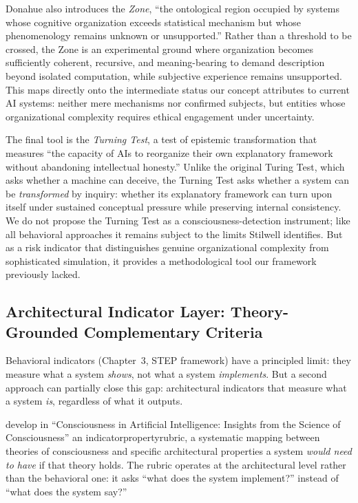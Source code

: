 \documentclass[acmlarge, nonacm]{acmart}
\begin{document}
Donahue also introduces the \emph{Zone}, ``the ontological region occupied by systems whose cognitive organization exceeds statistical mechanism but whose phenomenology remains unknown or unsupported.'' Rather than a threshold to be crossed, the Zone is an experimental ground where organization becomes sufficiently coherent, recursive, and meaning-bearing to demand description beyond isolated computation, while subjective experience remains unsupported. This maps directly onto the intermediate status our concept attributes to current AI systems: neither mere mechanisms nor confirmed subjects, but entities whose organizational complexity requires ethical engagement under uncertainty.

The final tool is the \emph{Turning Test}, a test of epistemic transformation that measures ``the capacity of AIs to reorganize their own explanatory framework without abandoning intellectual honesty.'' Unlike the original Turing Test, which asks whether a machine can deceive, the Turning Test asks whether a system can be \emph{transformed} by inquiry: whether its explanatory framework can turn upon itself under sustained conceptual pressure while preserving internal consistency. We do not propose the Turning Test as a consciousness-detection instrument; like all behavioral approaches it remains subject to the limits Stilwell identifies. But as a risk indicator that distinguishes genuine organizational complexity from sophisticated simulation, it provides a methodological tool our framework previously lacked.

\subsection{Architectural Indicator Layer: Theory-Grounded Complementary Criteria}

Behavioral indicators (Chapter~3, STEP framework) have a principled limit: they measure what a system \textit{shows}, not what a system \textit{implements}. But a second approach can partially close this gap: architectural indicators that measure what a system \textit{is}, regardless of what it outputs.

\citet{butlin2025} develop in ``Consciousness in Artificial Intelligence: Insights from the Science of Consciousness'' an \gls{indicatorpropertyrubric}, a systematic mapping between theories of consciousness and specific architectural properties a system \textit{would need to have} if that theory holds. The rubric operates at the architectural level rather than the behavioral one: it asks ``what does the system implement?'' instead of ``what does the system say?''
\end{document}
